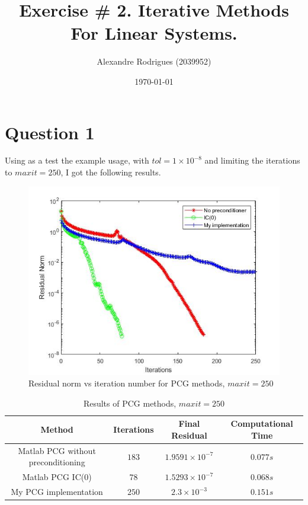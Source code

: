 \documentclass[a4paper, 11pt]{article}
\begin{document}
	
	\title{Exercise \# 2. Iterative Methods For Linear Systems. }
	\author{{\small Alexandre Rodrigues (2039952)}}
	\date{\today}
	
	\maketitle
		\section*{Question 1}
			Using as a test the example usage, with $tol = 1 \times 10^{-8}$ and limiting the iterations to $maxit=250$, I got the following results. 
		
			\begin{figure}[H]
				\centering
				\includegraphics[width=.6\linewidth]{ex1_it250.jpg}
				\caption{Residual norm vs iteration number for PCG methods, $maxit=250$}
				\label{fig:ex1_it250}
			\end{figure}
		
			\begin{table}[H]
				\centering
				\begin{tabular}{c|c|c|c}
					\textbf{Method} 					&  \textbf{Iterations} 	& \textbf{Final Residual} 		& \textbf{Computational Time} 	\\ \hline
					Matlab PCG without preconditioning	& 			$183$ 		& $ 1.9591 \times 10^{-7} $ 	& $ 0.077 s $					\\ \hline
					Matlab PCG IC(0)					& 			$78$ 		& $ 1.5293 \times 10^{-7} $ 	& $ 0.068 s $					\\ \hline	
					My PCG implementation				& 			$250$		& $ 2.3 \times 10^{-3} $		& $	0.151 s $					\\
				\end{tabular}
				\caption{Results of PCG methods, $maxit=250$}
				\label{table:ex1_it250}
			\end{table}
		
\end{document}
